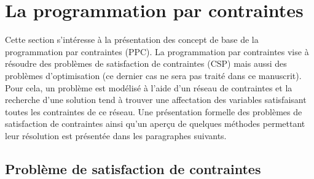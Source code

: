 \section{La programmation par contraintes}

Cette section s'intéresse à la présentation des concept de base de la
programmation par contraintes (PPC). La programmation par contraintes
vise à résoudre des problèmes de satisfaction de contraintes (CSP)
mais aussi des problèmes d'optimisation (ce dernier cas ne sera pas
traité dans ce manuscrit). Pour cela, un problème est
modélisé à l'aide d'un réseau de contraintes et la recherche d'une
solution tend à trouver une affectation des variables satisfaisant
toutes les contraintes de ce réseau. Une présentation formelle des
problèmes de satisfaction de contraintes ainsi qu'un aperçu de
quelques méthodes permettant leur résolution est présentée dans les
paragraphes suivants. 

\subsection{Problème de satisfaction de contraintes}

